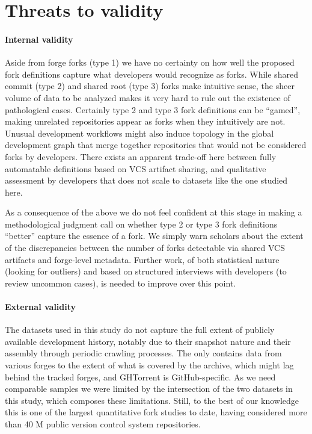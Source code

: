 \section{Threats to validity}%
\label{sec:forks-threats}

\paragraph{Internal validity}
Aside from forge forks (type 1) we have no certainty on how well the proposed
fork definitions capture what developers would recognize as forks. While shared
commit (type 2) and shared root (type 3) forks make intuitive sense, the sheer
volume of data to be analyzed makes it very hard to rule out the existence of
pathological cases. Certainly type 2 and type 3 fork definitions can be
``gamed'', making unrelated repositories appear as forks when they intuitively
are not. Unusual development workflows might also induce topology in the global
development graph that merge together repositories that would not be considered
forks by developers. There exists an apparent trade-off here between fully
automatable definitions based on \gls{VCS} artifact sharing, and qualitative
assessment by developers that does not scale to datasets like the one studied
here.

As a consequence of the above we do not feel confident at this stage in
making a methodological judgment call on whether type 2 or type 3 fork
definitions ``better'' capture the essence of a fork. We simply warn scholars
about the extent of the discrepancies between the number of forks detectable
via shared \gls{VCS} artifacts and forge-level metadata. Further work, of both
statistical nature (looking for outliers) and based on structured interviews
with developers (to review uncommon cases), is needed to improve over this
point.

\paragraph{External validity}
The datasets used in this study do not capture the full extent of publicly
available development history, notably due to their snapshot nature and their
assembly through periodic crawling processes. The \SWHGD{} only contains data
from various forges to the extent of what is covered by the \SWH{} archive,
which might lag behind the tracked forges, and GHTorrent is GitHub-specific. As
we need comparable samples we were limited by the intersection of the two
datasets in this study, which composes these limitations. Still, to the best of
our knowledge this is one of the largest quantitative fork studies to date,
having considered more than 40 M public version control system repositories.


